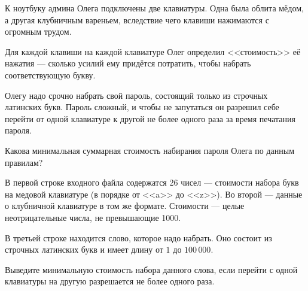 К ноутбуку админа Олега подключены две клавиатуры. Одна была облита мёдом,
а другая клубничным вареньем, вследствие чего клавиши нажимаются с огромным
трудом.

Для каждой клавиши на каждой клавиатуре Олег определил <<стоимость>> её нажатия
--- сколько усилий ему придётся потратить, чтобы набрать соответствующую букву.

Олегу надо срочно набрать свой пароль, состоящий только из строчных латинских
букв. Пароль сложный, и чтобы не запутаться он разрешил себе перейти от одной
клавиатуре к другой не более одного раза за время печатания пароля.

Какова минимальная суммарная стоимость набирания пароля Олега по данным
правилам?

\InputFile

В первой строке входного файла содержатся 26 чисел --- стоимости набора букв на
медовой клавиатуре (в порядке от <<a>> до <<z>>). Во второй --- данные
о клубничной клавиатуре в том же формате. Стоимости --- целые неотрицательные
числа, не превышающие 1000.

В третьей строке находится слово, которое надо набрать. Оно состоит из строчных
латинских букв и имеет длину от $1$ до $100\,000$.

\OutputFile

Выведите минимальную стоимость набора данного слова, если перейти с одной
клавиатуры на другую разрешается не более одного раза.

\SAMPLES
